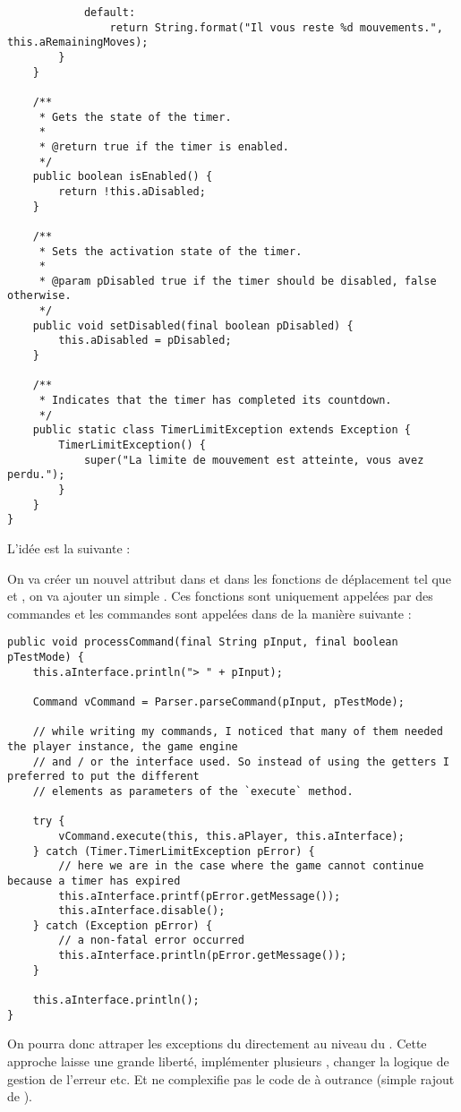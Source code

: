 \begin{exercise}[subtitle=Limite de temps]
\begin{verbatim}
            default:
                return String.format("Il vous reste %d mouvements.", this.aRemainingMoves);
        }
    }

    /**
     * Gets the state of the timer.
     *
     * @return true if the timer is enabled.
     */
    public boolean isEnabled() {
        return !this.aDisabled;
    }

    /**
     * Sets the activation state of the timer.
     *
     * @param pDisabled true if the timer should be disabled, false otherwise.
     */
    public void setDisabled(final boolean pDisabled) {
        this.aDisabled = pDisabled;
    }

    /**
     * Indicates that the timer has completed its countdown.
     */
    public static class TimerLimitException extends Exception {
        TimerLimitException() {
            super("La limite de mouvement est atteinte, vous avez perdu.");
        }
    }
}
\end{verbatim}

L'idée est la suivante :

On va créer un nouvel attribut  dans  et dans les fonctions de déplacement tel que  et , on va ajouter un simple . Ces fonctions sont uniquement appelées par des commandes et les commandes sont appelées dans  de la manière suivante :

\begin{verbatim}
public void processCommand(final String pInput, final boolean pTestMode) {
    this.aInterface.println("> " + pInput);

    Command vCommand = Parser.parseCommand(pInput, pTestMode);

    // while writing my commands, I noticed that many of them needed the player instance, the game engine
    // and / or the interface used. So instead of using the getters I preferred to put the different
    // elements as parameters of the `execute` method.

    try {
        vCommand.execute(this, this.aPlayer, this.aInterface);
    } catch (Timer.TimerLimitException pError) {
        // here we are in the case where the game cannot continue because a timer has expired
        this.aInterface.printf(pError.getMessage());
        this.aInterface.disable();
    } catch (Exception pError) {
        // a non-fatal error occurred
        this.aInterface.println(pError.getMessage());
    }

    this.aInterface.println();
}
\end{verbatim}
 
On pourra donc attraper les exceptions du  directement au niveau du . Cette approche laisse une grande liberté, implémenter plusieurs , changer la logique de gestion de l'erreur etc. Et ne complexifie pas le code de  à outrance (simple rajout de ).

\end{exercise}

